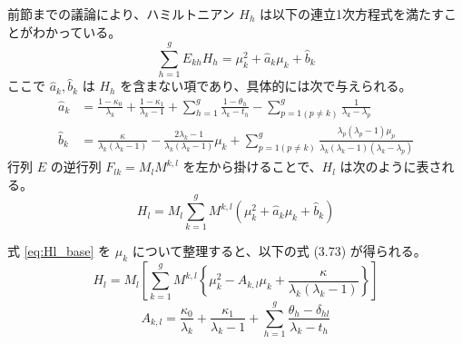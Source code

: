 前節までの議論により、ハミルトニアン $H_h$ は以下の連立1次方程式を満たすことがわかっている。
\begin{equation*}
    \sum_{h=1}^g E_{kh} H_h = \mu_k^2 + \hat{a}_k \mu_k + \hat{b}_k
\end{equation*}
ここで $\hat{a}_k, \hat{b}_k$ は $H_h$ を含まない項であり、具体的には次で与えられる。
\begin{align*}
    \hat{a}_k &= \frac{1-\kappa_0}{\lambda_k} + \frac{1-\kappa_1}{\lambda_k-1} + \sum_{h=1}^g \frac{1-\theta_h}{\lambda_k-t_h} - \sum_{p=1 (p \neq k)}^g \frac{1}{\lambda_k-\lambda_p} \\
    \hat{b}_k &= \frac{\kappa}{\lambda_k(\lambda_k-1)} - \frac{2\lambda_k-1}{\lambda_k(\lambda_k-1)}\mu_k + \sum_{p=1 (p \neq k)}^g \frac{\lambda_p(\lambda_p-1)\mu_p}{\lambda_k(\lambda_k-1)(\lambda_k-\lambda_p)}
\end{align*}
行列 $E$ の逆行列 $F_{lk} = M_l M^{k,l}$ を左から掛けることで、$H_l$ は次のように表される。
\begin{equation}
    H_l = M_l \sum_{k=1}^g M^{k,l} \left( \mu_k^2 + \hat{a}_k \mu_k + \hat{b}_k \right) \label{eq:Hl_base}
\end{equation}

\begin{theorem}[ハミルトニアンの最終形態]
式 \eqref{eq:Hl_base} を $\mu_k$ について整理すると、以下の式 (3.73) が得られる。
\begin{equation}
    H_l = M_l \left[ \sum_{k=1}^g M^{k,l} \left\{ \mu_k^2 - A_{k,l}\mu_k + \frac{\kappa}{\lambda_k(\lambda_k-1)} \right\} \right]
\end{equation}
\begin{equation*}
    A_{k,l} = \frac{\kappa_0}{\lambda_k} + \frac{\kappa_1}{\lambda_k-1} + \sum_{h=1}^g \frac{\theta_h - \delta_{hl}}{\lambda_k - t_h}
\end{equation*}
\end{theorem}

